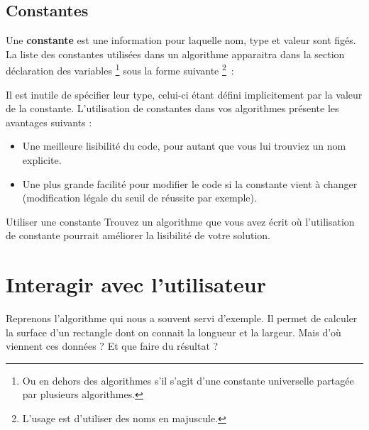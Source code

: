 		\subsection{Constantes}
	
			Une \textbf{constante} est une information pour laquelle nom, type et
			valeur sont figés. La liste des constantes utilisées dans un algorithme
			apparaitra dans la section déclaration des variables%
			\footnote{%
				Ou en dehors des algorithmes s'il s'agit d'une
				constante universelle partagée par plusieurs algorithmes.%
			} 
			sous la forme suivante%
			\footnote{%
				L'usage est d'utiliser des noms en majuscule.%
			}~:
	
			\begin{LDA}
			\end{LDA}
	
			Il est inutile de spécifier leur type, celui-ci
			étant défini implicitement par la valeur de la constante.	
			L'utilisation de constantes dans vos algorithmes présente
			les avantages suivants :
			\begin{itemize}
			\item
				Une meilleure lisibilité du code,
				pour autant que vous lui trouviez un nom explicite.
			\item
				Une plus grande facilité pour modifier le code
				si la constante vient à changer 
				(modification légale du seuil de réussite par exemple).
			\end{itemize}
			
			\begin{Exercice}{Utiliser une constante}
				Trouvez un algorithme que vous avez écrit
				où l'utilisation de constante
				pourrait améliorer la lisibilité de votre solution.
			\end{Exercice}
			
	\section{Interagir avec l'utilisateur}
	
		Reprenons l'algorithme 
		qui nous a souvent servi d'exemple.
		Il permet de calculer la surface d'un rectangle
		dont on connait la longueur et la largeur.
		Mais d'où viennent ces données ?
		Et que faire du résultat ?
		
